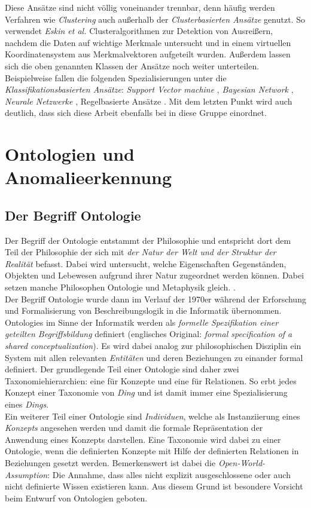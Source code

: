 Diese Ansätze sind nicht völlig voneinander trennbar, denn häufig werden Verfahren wie \textit{Clustering} auch außerhalb der \textit{Clusterbasierten Ansätze} genutzt. So verwendet \textit{Eskin et al.} \cite{eskin2002geometric} Clusteralgorithmen zur Detektion von Ausreißern, nachdem die Daten auf wichtige Merkmale untersucht und in einem virtuellen Koordinatensystem aus Merkmalvektoren aufgeteilt wurden. Außerdem lassen sich die oben genannten Klassen der Ansätze noch weiter unterteilen. Beispielweise fallen die folgenden Spezialisierungen unter die \textit{Klassifikationsbasierten Ansätze}: \textit{Support Vector machine} \cite{noble2006support}, \textit{Bayesian Network} \cite{kruegel2003bayesian}, \textit{Neurale Netzwerke} \cite{zhang2001hide}, Regelbasierte Ansätze \cite{yang2013rule}. Mit dem letzten Punkt wird auch deutlich, dass sich diese Arbeit ebenfalls bei in diese Gruppe einordnet.

\section{Ontologien und Anomalieerkennung}
\subsection{Der Begriff Ontologie}
Der Begriff der \Gls{Ontologie} entstammt der Philosophie und entspricht dort dem Teil der Philosophie der sich mit \textit{der Natur der Welt und der Struktur der Realität} befasst. Dabei wird untersucht, welche Eigenschaften  Gegenständen, Objekten und Lebewesen aufgrund ihrer Natur zugeordnet werden können. Dabei setzen manche Philosophen \Gls{Ontologie} und Metaphysik gleich. \cite{guarino2009ontology}.\\
Der Begriff \Gls{Ontologie} wurde dann im Verlauf der 1970er während der Erforschung und Formalisierung von Beschreibungslogik in die Informatik übernommen\cite{roy2010exploitation}. \Glspl{Ontologie} im Sinne der Informatik werden als \textit{formelle Spezifikation einer geteilten Begriffsbildung} definiert (englisches Original: \textit{formal speciﬁcation of a shared conceptualization}\cite{borst1999construction}). Es wird dabei analog zur philosophischen Disziplin ein System mit allen relevanten \textit{Entitäten} und deren Beziehungen zu einander formal definiert. Der grundlegende Teil einer Ontologie sind daher zwei Taxonomiehierarchien: eine für Konzepte und eine für Relationen. So erbt jedes Konzept einer Taxonomie von \textit{Ding} und ist damit immer eine Spezialisierung eines \textit{Dings}.\\
Ein weiterer Teil einer Ontologie sind \textit{Individuen}, welche als Instanziierung eines \textit{Konzepts} angesehen werden und damit die formale Repräsentation der Anwendung eines Konzepts darstellen. Eine Taxonomie wird dabei zu einer Ontologie, wenn die definierten Konzepte mit Hilfe der definierten Relationen in Beziehungen gesetzt werden. Bemerkenswert ist dabei die \textit{Open-World-Assumption}: Die Annahme, dass alles nicht explizit ausgeschlossene oder auch nicht definierte Wissen existieren kann\cite{razniewski2016turning}. Aus diesem Grund ist besondere Vorsicht beim Entwurf von Ontologien geboten.

